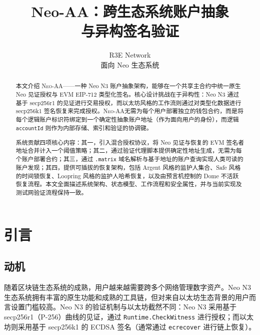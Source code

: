 \documentclass[10pt]{article}
\newcommand{\sys}{\textsc{Neo-AA}}
\newcommand{\code}[1]{\texttt{\small #1}}
\begin{document}
\sloppy
\hfuzz=300pt
\vfuzz=3pt
\setlength{\emergencystretch}{3em}

\title{Neo-AA：跨生态系统账户抽象\\与异构签名验证}
\author{R3E Network \\ \small 面向 Neo 生态系统}
\date{}
\maketitle

\begin{abstract}
本文介绍 \sys——一种 Neo N3 账户抽象架构，能够在一个共享主合约中统一原生 Neo 见证授权与 EVM EIP-712 类型化签名。核心设计挑战在于异构性：Neo N3 通过基于 secp256r1 的见证进行交易授权，而以太坊风格的工作流则通过对类型化数据进行 secp256k1 签名恢复来完成授权。\sys 无需为每个用户部署独立的钱包合约，而是将每个逻辑账户标识符绑定到一个确定性抽象账户地址（作为面向用户的身份），而逻辑 \code{accountId} 则作为内部存储、索引和验证的协调键。

系统贡献四项核心内容：其一，引入混合授权协议，将 Neo 见证与恢复的 EVM 签名者地址合并计入一个阈值策略；其二，通过验证代理脚本提供确定性地址生成，无需为每个账户部署合约；其三，通过 \code{.matrix} 域名解析与基于地址的账户查询实现人类可读的账户发现；其四，提供可插拔的恢复架构，包括 Argent 风格的监护人集合、Safe 风格的时间锁恢复、Loopring 风格的监护人哈希恢复，以及由预言机控制的 Dome 不活跃恢复流程。本文全面描述系统架构、状态模型、工作流程和安全属性，并与当前实现及测试网验证流程保持一致。
\end{abstract}

\tableofcontents
\newpage

\section{引言}

\subsection{动机}

随着区块链生态系统的成熟，用户越来越需要跨多个网络管理数字资产。Neo N3 生态系统拥有丰富的原生功能和成熟的工具链，但对来自以太坊生态背景的用户而言设置门槛较高。Neo N3 的验证机制与以太坊截然不同：Neo N3 采用基于 secp256r1（P-256）曲线的见证，通过 \code{Runtime.CheckWitness} 进行授权；而以太坊则采用基于 secp256k1 的 ECDSA 签名（通常通过 \code{ecrecover} 进行链上恢复）。
\end{document}
